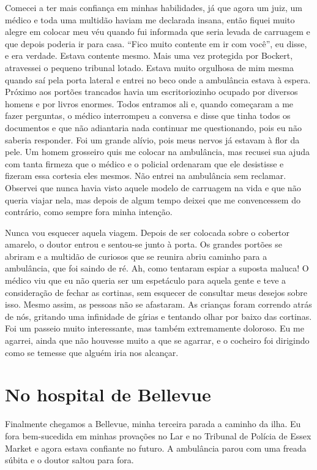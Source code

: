 Comecei a ter mais confiança em minhas habilidades, já que agora um
juiz, um médico e toda uma multidão haviam me declarada insana, então
fiquei muito alegre em colocar meu véu quando fui informada que seria
levada de carruagem e que depois poderia ir para casa. ``Fico muito
contente em ir com você'', eu disse, e era verdade. Estava contente
mesmo. Mais uma vez protegida por Bockert, atravessei o pequeno
tribunal lotado. Estava muito orgulhosa de mim mesma quando saí pela
porta lateral e entrei no beco onde a ambulância estava à espera.
Próximo aos portões trancados havia um escritoriozinho ocupado por
diversos homens e por livros enormes. Todos entramos ali e, quando
começaram a me fazer perguntas, o médico interrompeu a conversa e disse
que tinha todos os documentos e que não adiantaria nada continuar me
questionando, pois eu não saberia responder. Foi um grande alívio, pois
meus nervos já estavam à flor da pele. Um homem grosseiro quis me
colocar na ambulância, mas recusei sua ajuda com tanta firmeza que o
médico e o policial ordenaram que ele desistisse e fizeram essa cortesia
eles mesmos. Não entrei na ambulância sem reclamar. Observei que nunca
havia visto aquele modelo de carruagem na vida e que não queria viajar
nela, mas depois de algum tempo deixei que me convencessem do contrário,
como sempre fora minha intenção.

Nunca vou esquecer aquela viagem. Depois de ser colocada sobre o
cobertor amarelo, o doutor entrou e sentou-se junto à porta. Os grandes
portões se abriram e a multidão de curiosos que se reunira abriu caminho
para a ambulância, que foi saindo de ré. Ah, como tentaram espiar a
suposta maluca! O médico viu que eu não queria ser um espetáculo para
aquela gente e teve a consideração de fechar as cortinas, sem esquecer
de consultar meus desejos sobre isso. Mesmo assim, as pessoas não se
afastaram. As crianças foram correndo atrás de nós, gritando uma
infinidade de gírias e tentando olhar por baixo das cortinas. Foi um
passeio muito interessante, mas também extremamente doloroso. Eu me
agarrei, ainda que não houvesse muito a que se agarrar, e o cocheiro
foi dirigindo como se temesse que alguém iria nos alcançar.

\label{section-3}

\chapter{No hospital de
Bellevue}\label{capuxedtulo-vi-no-hospital-de-bellevue}

Finalmente chegamos a Bellevue, minha terceira parada a caminho da ilha.
Eu fora bem-sucedida em minhas provações no Lar e no Tribunal de Polícia
de Essex Market e agora estava confiante no futuro. A ambulância parou
com uma freada súbita e o doutor saltou para fora. 

